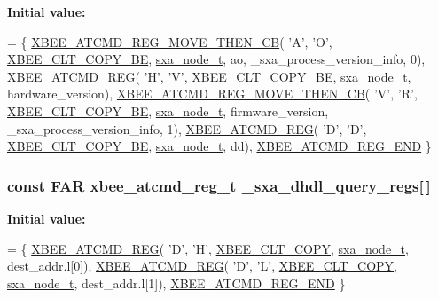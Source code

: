 {\bfseries Initial value\-:}
\begin{DoxyCode}
= \{
   \hyperlink{group__xbee__atcmd_gaf5f12cd2d94f9f4ecf0a679196a6ed21}{XBEE\_ATCMD\_REG\_MOVE\_THEN\_CB}( \textcolor{charliteral}{'A'}, \textcolor{charliteral}{'O'}, 
      \hyperlink{group__xbee__atcmd_gga1bd8ecd38c107579d20ded3c79a7d70ba0be0c682bc30049849b0c169b661c537}{XBEE\_CLT\_COPY\_BE},
                  \hyperlink{structsxa__node__t}{sxa\_node\_t}, ao,
                  \_sxa\_process\_version\_info, 0),
   \hyperlink{group__xbee__atcmd_gaafe33c3d8ea48b42b25d1183eaf93071}{XBEE\_ATCMD\_REG}( \textcolor{charliteral}{'H'}, \textcolor{charliteral}{'V'}, \hyperlink{group__xbee__atcmd_gga1bd8ecd38c107579d20ded3c79a7d70ba0be0c682bc30049849b0c169b661c537}{XBEE\_CLT\_COPY\_BE}, 
      \hyperlink{structsxa__node__t}{sxa\_node\_t}, hardware\_version),
   \hyperlink{group__xbee__atcmd_gaf5f12cd2d94f9f4ecf0a679196a6ed21}{XBEE\_ATCMD\_REG\_MOVE\_THEN\_CB}( \textcolor{charliteral}{'V'}, \textcolor{charliteral}{'R'}, 
      \hyperlink{group__xbee__atcmd_gga1bd8ecd38c107579d20ded3c79a7d70ba0be0c682bc30049849b0c169b661c537}{XBEE\_CLT\_COPY\_BE},
                  \hyperlink{structsxa__node__t}{sxa\_node\_t}, firmware\_version,
                  \_sxa\_process\_version\_info, 1),
   \hyperlink{group__xbee__atcmd_gaafe33c3d8ea48b42b25d1183eaf93071}{XBEE\_ATCMD\_REG}( \textcolor{charliteral}{'D'}, \textcolor{charliteral}{'D'}, \hyperlink{group__xbee__atcmd_gga1bd8ecd38c107579d20ded3c79a7d70ba0be0c682bc30049849b0c169b661c537}{XBEE\_CLT\_COPY\_BE}, 
      \hyperlink{structsxa__node__t}{sxa\_node\_t}, dd),
   \hyperlink{group__xbee__atcmd_ga22fe547f7ae9fd0b090c5e45f03c162d}{XBEE\_ATCMD\_REG\_END}
\}
\end{DoxyCode}
\hypertarget{group___s_x_a_ga6fccbd755db52c5f1da42d07f76fcb11}{
\subsubsection[{\-\_\-sxa\-\_\-dhdl\-\_\-query\-\_\-regs}]{\setlength{\rightskip}{0pt plus 5cm}const {\bf F\-A\-R} {\bf xbee\-\_\-atcmd\-\_\-reg\-\_\-t} \-\_\-sxa\-\_\-dhdl\-\_\-query\-\_\-regs\mbox{[}$\,$\mbox{]}}}\label{group___s_x_a_ga6fccbd755db52c5f1da42d07f76fcb11}
{\bfseries Initial value\-:}
\begin{DoxyCode}
= \{
   \hyperlink{group__xbee__atcmd_gaafe33c3d8ea48b42b25d1183eaf93071}{XBEE\_ATCMD\_REG}( \textcolor{charliteral}{'D'}, \textcolor{charliteral}{'H'}, \hyperlink{group__xbee__atcmd_gga1bd8ecd38c107579d20ded3c79a7d70baef8d715c8725d801676943b868508633}{XBEE\_CLT\_COPY}, 
      \hyperlink{structsxa__node__t}{sxa\_node\_t}, dest\_addr.l[0]),
   \hyperlink{group__xbee__atcmd_gaafe33c3d8ea48b42b25d1183eaf93071}{XBEE\_ATCMD\_REG}( \textcolor{charliteral}{'D'}, \textcolor{charliteral}{'L'}, \hyperlink{group__xbee__atcmd_gga1bd8ecd38c107579d20ded3c79a7d70baef8d715c8725d801676943b868508633}{XBEE\_CLT\_COPY}, 
      \hyperlink{structsxa__node__t}{sxa\_node\_t}, dest\_addr.l[1]),
   \hyperlink{group__xbee__atcmd_ga22fe547f7ae9fd0b090c5e45f03c162d}{XBEE\_ATCMD\_REG\_END}
\}
\end{DoxyCode}

